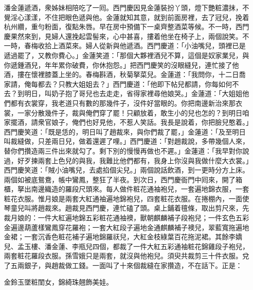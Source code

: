 潘金蓮遞酒，衆姊妹相陪吃了一囘。西門慶因見金蓮裝扮丫頭，燈下艷粧濃抹，不覺淫心漾漾，不住把眼色遞與他。金蓮就知其意，就到前面房裡，去了冠兒，挽着杭州纘，重勻粉面，復點朱唇。早在房中預備下一桌齊整酒菜等候。不一時，西門慶果然來到，見婦人還挽起雲髻來，心中甚喜，摟着他坐在椅子上，兩個說笑。不一時，春梅收拾上酒菜來。婦人從新與他遞酒。西門慶道：「小油嘴兒，頭裡已是遞過罷了，又教你費心。」金蓮笑道：「那個大夥裡酒兒不算，這個是奴家業兒，與你遞鍾酒兒，年年累你破費，你休抱怨。」把西門慶笑的沒眼縫兒，連忙接了他酒，摟在懷裡膝蓋上坐的。春梅斟酒，秋菊拏菜兒。金蓮道：「我問你，十二日喬家請，俺每都去？只教大姐姐去？」西門慶道：「他即下帖兒都請，你每如何不去？到明日，叫奶子抱了哥兒也去走走，省得家裡尋他娘哭。」金蓮道：「大姐姐他們都有衣裳穿，我老道只有數的那幾件子，沒件好當眼的。你把南邊新治來那衣裳，一家分散幾件子，裁與俺們穿了罷！只顧放着，敢生小的兒也怎的？到明日咱家擺酒，請衆官娘子，俺們也好見他，不惹人笑話。我長是說着，你把臉兒憨着。」西門慶笑道：「既是恁的，明日叫了趙裁來，與你們裁了罷，」金蓮道：「及至明日叫裁縫做，只差兩日兒，做着還遲了哩。」西門慶道：「對趙裁說，多帶幾個人來，替你們攢造兩三件出來就勾了。剩下別的慢慢再做也不遲。」金蓮道：「我早對你說過，好歹揀兩套上色兒的與我，我難比他們都有，我身上你沒與我做什麼大衣裳。」西門慶笑道：「賊小油嘴兒，去處掐個尖兒。」兩個說話飲酒，到一更時分方上床。兩個如被底鴛鴦，帳中鸞鳳，整狂了半夜。到次日，西門慶衙門中囘來，開了箱櫃，拏出南邊織造的羅段尺頭來。每人做件粧花通袖袍兒，一套遍地錦衣服，一套粧花衣服。惟月娘是兩套大紅通袖遍地錦袍兒，四套粧花衣服。在捲棚內，一面使琴童兒叫將趙裁來。趙裁見西門慶，連忙磕了頭。桌上鋪着氊條，取出剪尺來，先裁月娘的：一件大紅遍地錦五彩粧花通袖襖，獸朝麒麟補子段袍兒；一件玄色五彩金遍邊葫蘆樣鸞鳳穿花羅袍；一套大紅段子遍地金通麒麟補子襖兒，翠藍寬拖遍地金裙；一套沉香色粧花補子遍地錦羅祆兒，大紅金枝綠葉百花拖泥裙。其餘李嬌兒、孟玉樓、潘金蓮、李瓶兒四個，都裁了一件大紅五彩通袖粧花錦雞段子袍兒，兩套粧花羅段衣服。孫雪娥只是兩套，就沒與他袍兒。須臾共裁剪三十件衣服。兌了五兩銀子，與趙裁做工錢。一面叫了十來個裁縫在家攢造，不在話下。正是：

\begin{myquote}
金鈴玉墜粧閨女，錦綺珠翹飾美娃。
\end{myquote}

